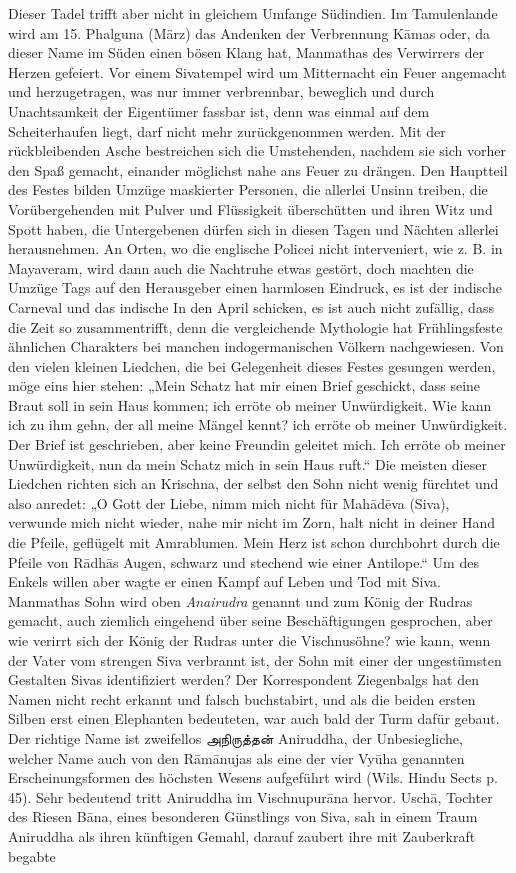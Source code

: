 \documentclass{article}
\newcommand{\TamilText}[1]{\texttamil{#1}}
\newcommand{\tam}[1]{\TamilText{#1}}
\begin{document}
Dieser Tadel trifft aber nicht in gleichem Umfange Südindien. Im Tamulenlande wird am 15. Phalguna (März) das Andenken der Verbrennung K\={a}mas oder, da dieser Name im Süden einen bösen Klang hat, Manmathas des Verwirrers der Herzen gefeiert. Vor einem Sivatempel wird um Mitternacht ein Feuer angemacht und herzugetragen, was nur immer verbrennbar, beweglich und durch Unachtsamkeit der Eigentümer fassbar ist, denn was einmal auf dem Scheiterhaufen liegt, darf nicht mehr zurückgenommen werden. Mit der rückbleibenden Asche bestreichen sich die Umstehenden, nachdem sie sich vorher den Spaß gemacht, einander möglichst nahe ans Feuer zu drängen. Den Hauptteil des Festes bilden Umzüge maskierter Personen, die allerlei Unsinn treiben, die Vorübergehenden mit Pulver und Flüssigkeit überschütten und ihren Witz und Spott haben, die Untergebenen dürfen sich in diesen Tagen und Nächten allerlei herausnehmen. An Orten, wo die englische Policei nicht interveniert, wie z. B. in Mayaveram, wird dann auch die Nachtruhe etwas gestört, doch machten die Umzüge Tags auf den Herausgeber einen harmlosen Eindruck, es ist der indische Carneval und das indische In den April schicken, es ist auch nicht zufällig, dass die Zeit so zusammentrifft, denn die vergleichende Mythologie hat Frühlingsfeste ähnlichen Charakters bei manchen indogermanischen Völkern nachgewiesen. Von den vielen kleinen Liedchen, die bei Gelegenheit dieses Festes gesungen werden, möge eins hier stehen: „Mein Schatz hat mir einen Brief geschickt, dass seine Braut soll in sein Haus kommen; ich erröte ob meiner Unwürdigkeit. Wie kann ich zu ihm gehn, der all meine Mängel kennt? ich erröte ob meiner Unwürdigkeit. Der Brief ist geschrieben, aber keine Freundin geleitet mich. Ich erröte ob meiner Unwürdigkeit, nun da mein Schatz mich in sein Haus ruft.“ Die meisten dieser Liedchen richten sich an Krischna, der selbst den Sohn nicht wenig fürchtet und also anredet: „O Gott der Liebe, nimm mich nicht für Mah\={a}d\={e}va (Siva), verwunde mich nicht wieder, nahe mir nicht im Zorn, halt nicht in deiner Hand die Pfeile, geflügelt mit Amrablumen. Mein Herz ist schon durchbohrt durch die Pfeile von R\={a}dh\={a}s Augen, schwarz und stechend wie einer Antilope.“ Um des Enkels willen aber wagte er einen Kampf auf Leben und Tod mit Siva. Manmathas Sohn wird oben \emph{Anairudra} genannt und zum König der Rudras gemacht, auch ziemlich eingehend über seine Beschäftigungen gesprochen, aber wie verirrt sich der König der Rudras unter die Vischnusöhne? wie kann, wenn der Vater vom strengen Siva verbrannt ist, der Sohn mit einer der ungestümsten Gestalten Sivas identifiziert werden? Der Korrespondent Ziegenbalgs hat den Namen nicht recht erkannt und falsch buchstabirt, und als die beiden ersten Silben erst einen Elephanten bedeuteten, war auch bald der Turm dafür gebaut. Der richtige Name ist zweifellos \tam{அநிருத்தன்} Aniruddha, der Unbesiegliche, welcher Name auch von den R\={a}m\={a}nujas als eine der vier Vy\={u}ha genannten Erscheinungsformen des höchsten Wesens aufgeführt wird (Wils. Hindu Sects p. 45). Sehr bedeutend tritt Aniruddha im Vischnupur\={a}na hervor. Usch\={a}, Tochter des Riesen B\={a}na, eines besonderen Günstlings von Siva, sah in einem Traum Aniruddha als ihren künftigen Gemahl, darauf zaubert ihre mit Zauberkraft begabte 
\end{document}
